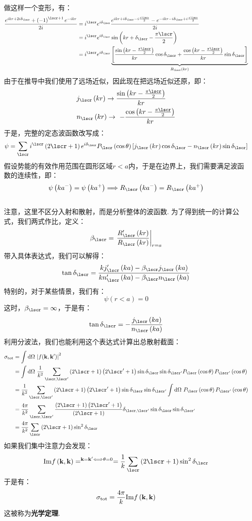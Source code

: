 做这样一个变形，有：
\begin{align*}
\frac{e^{ikr + 2i\delta_{\lscr}} + \br{-1}^{\lscr + 1}e^{-ikr}}{2i} 
& = i^{\lscr}e^{i\delta_{\lscr}}\frac{e^{ikr + i\delta_{\lscr} - i\frac{\pi\lscr}{2}} - e^{-ikr - i\delta_{\lscr} + i\frac{\pi\lscr}{2}}}{2i} \\
& = i^{\lscr}e^{i\delta_{\lscr}}\sin\br{kr + \delta_{\lscr} - \frac{\pi\lscr}{2}} \\
& = i^{\lscr}e^{i\delta_{\lscr}}\underbrace{\mbr{\frac{\sin\br{kr - \frac{\pi\lscr}{2}}}{kr}\cos\delta_{\lscr} + \frac{\cos\br{kr - \frac{\pi\lscr}{2}}}{kr}\sin\delta_{\lscr}}}_{R_{\lscr}\br{kr}}
\end{align*}
由于在推导中我们使用了远场近似，因此现在把远场近似还原，即：
\begin{align*}
& j_{\lscr}\br{kr}\to\frac{\sin\br{kr - \frac{\pi\lscr}{2}}}{kr} \\
& n_{\lscr}\br{kr}\to\ -\frac{\cos\br{kr - \frac{\pi\lscr}{2}}}{kr}
\end{align*}
于是，完整的定态波函数改写成：
\begin{align*}
\psi = \sum_{\lscr}i^{\lscr}\br{2\lscr + 1}e^{i\delta_{\lscr}}P_{\lscr}\br{\cos\theta}\mbr{j_{\lscr}\br{kr}\cos\delta_{\lscr} - n_{\lscr}\br{kr}\sin\delta_{\lscr}}
\end{align*}
假设势能的有效作用范围在圆形区域\(r<a\)内，于是在边界上，我们需要满足波函数的连续性，即：
\begin{align*}
& \psi\br{ka^{-}} = \psi\br{ka^{+}} \Longrightarrow R_{\lscr}\br{ka^{-}} = R_{\lscr}\br{ka^{+}} \\
& 
\end{align*}
注意，这里不区分入射和散射，而是分析整体的波函数. 为了得到统一的计算公式，我们两式作比，定义：
\[
\beta_{\lscr} = \evalat{\frac{R'_{\lscr}\br{kr}}{R_{\lscr}\br{kr}}}{r = a}
\]
带入具体表达式，我们可以解得：
\[
\tan\delta_{\lscr} = \frac{kj_{\lscr}'\br{ka} - \beta_{\lscr}j_{\lscr}\br{ka}}{kn'_{\lscr}\br{ka} - \beta_{\lscr}n_{\lscr}\br{ka}}
\]
特别的，对于某些情景，我们有：
\[
\psi(r<a) = 0
\]
这时，\(\beta_{\lscr} = \infty\)，于是有：
\[
\tan\delta_{\lscr} = -\frac{j_{\lscr}\br{ka}}{n_{\lscr}\br{ka}}
\]
利用分波法，我们也能利用这个表达式计算出总散射截面：
\begin{align*}
\sigma_{\mathrm{tot}}
& = \int\dd\Omega\ \abs{f(\vk,\vk')}^{2} \\
& = \int\dd\Omega\ \frac{1}{k^{2}}\sum_{\lscr,\lscr'}\br{2\lscr+1}\br{2\lscr'+1}\sin\delta_{\lscr}\sin\delta_{\lscr'}P_{\lscr}\br{\cos\theta}P_{\lscr'}\br{\cos\theta} \\
& = \frac{1}{k^{2}}\sum_{\lscr,\lscr'}\br{2\lscr+1}\br{2\lscr'+1}\sin\delta_{\lscr}\sin\delta_{\lscr'}\int{\dd\Omega}\ P_{\lscr}\br{\cos\theta}P_{\lscr'}\br{\cos\theta} \\
& = \frac{4\pi}{k^{2}}\sum_{\lscr,\lscr'}\frac{\br{2\lscr + 1}\br{2\lscr'+1}}{\br{2\lscr + 1}}\delta_{\lscr,\lscr'}\sin\delta_{\lscr}\sin\delta_{\lscr'} \\
& = \frac{4\pi}{k^{2}}\sum_{\lscr}\br{2\lscr + 1}\sin^{2}\delta_{\lscr}
\end{align*}
如果我们集中注意力会发现：
\[
\mathrm{Im}f\br{\vk,\vk} =^{\vk=\vk'\Longleftrightarrow\theta = 0}= \frac{1}{k}\sum_{\lscr}\br{2\lscr + 1}\sin^{2}\delta_{\lscr}
\]
于是有：
\[
\sigma_{\mathrm{tot}} = \frac{4\pi}{k}\mathrm{Im}f\left({\mathbf{k},\mathbf{k}}\right)
\]
这被称为\textbf{光学定理}. 